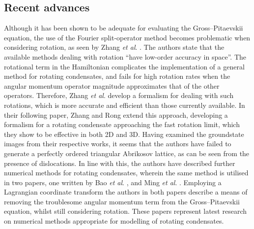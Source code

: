 \subsection{Recent advances}
Although it has been shown to be adequate for evaluating the Gross--Pitaevskii equation, the use of the Fourier split-operator method becomes problematic when considering rotation, as seen by Zhang \textit{et al}. \cite{BEC:Zhang_anm_2007}. The authors state that the available methods dealing with rotation ``have low-order accuracy in space''. The rotational term in the Hamiltonian complicates the implementation of a general method for rotating condensates, and fails for high rotation rates when the angular momentum operator magnitude approximates that of the other operators. Therefore, Zhang \textit{et al}. develop a formalism for dealing with such rotations, which is more accurate and efficient than those currently available. In their following paper, Zhang and Rong \cite{Vtx:Zeng_cpc_2009} extend this approach, developing a formalism for a rotating condensate approaching the fast rotation limit, which they show to be effective in both 2D and 3D. Having examined the groundstate images from their respective works, it seems that the authors have failed to generate a perfectly ordered triangular Abrikosov lattice, as can be seen from the presence of dislocations. In line with this, the authors have described further numerical methods for rotating condensates, wherein the same method is utilised in two papers, one written by Bao \textit{et al}. \cite{Num:Bao_siam_2013}, and Ming \textit{et al}. \cite{Num:Ming_jcp_2014}. Employing a Lagrangian coordinate transform the authors in both papers describe a means of removing the troublesome angular momentum term from the Gross--Pitaevskii equation, whilst still considering rotation. These papers represent latest research on numerical methods appropriate for modelling of rotating condensates.

